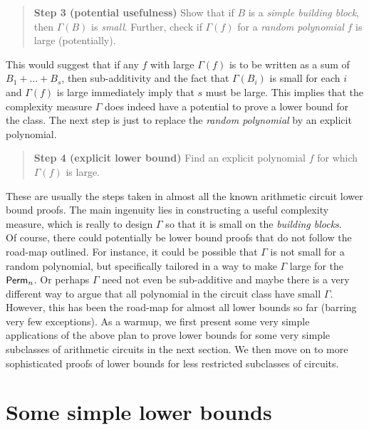 \documentclass{birkjour}
\begin{document}
\begin{quote}
{\bf Step 3 (potential usefulness)} Show that if $B$ is a \emph{simple building block}, then $\Gamma(B)$ is \emph{small}.
Further, check if $\Gamma(f)$ for a \emph{random polynomial} $f$ is large (potentially). 
\end{quote}

This would suggest that if any $f$ with large $\Gamma(f)$ is to be written as a sum of $B_1 + \dots + B_s$, then sub-additivity and the fact that $\Gamma(B_i)$ is small for each $i$ and $\Gamma(f)$ is large immediately imply that $s$ must be large. This implies that the complexity measure $\Gamma$ does indeed have a potential to prove a lower bound for the class. The next step is just to replace the \emph{random polynomial} by an explicit polynomial. 

\begin{quote}
{\bf Step 4 (explicit lower bound)} Find an explicit polynomial $f$ for which $\Gamma(f)$ is large. 
\end{quote} 



These are usually the steps taken in almost all the known arithmetic circuit lower bound proofs. The main ingenuity lies in constructing a useful complexity measure, which is really to design $\Gamma$ so that it is small on the \emph{building blocks}. \\

Of course, there could potentially be lower bound proofs that do not follow the road-map outlined. For instance, it could be possible that $\Gamma$ is not small for a random polynomial, but specifically tailored in a way to make $\Gamma$ large for the $\mathsf{Perm}_n$. Or perhaps $\Gamma$ need not even be sub-additive and maybe there is a very different way to argue that all polynomial in the circuit class have small $\Gamma$. However, this has been the road-map for almost all lower bounds so far (barring very few exceptions). As a warmup, we first present some very simple applications of the above plan to prove lower bounds for some very simple subclasses of arithmetic circuits in the next section. We then move on to more sophisticated proofs of lower bounds for less restricted subclasses of circuits. 




\section{Some simple lower bounds}
\end{document}

